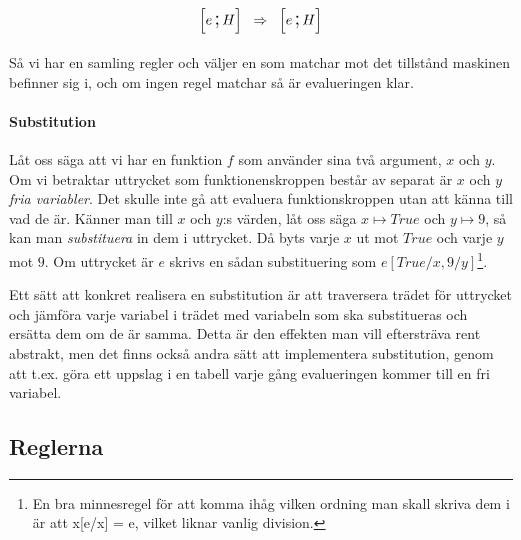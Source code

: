 \documentclass[../Core]{subfiles}
\begin{document}
\begin{equation*}
        \tikz[baseline]{\node[anchor=base] (m1) 
            {\conf{}{$ e \csep H$}};
        } \tikz[baseline]{\node[anchor=base](msep){$\rulesep$};}
        \tikz[baseline]{
            \node[anchor=base] (m2)
            {\conf{}{$ e \csep H$}};
        } 
\end{equation*}



Så vi har en samling regler och väljer en som matchar mot det tillstånd maskinen befinner sig i, och om ingen regel matchar så är evalueringen klar.

\paragraph{Substitution}

Låt oss säga att vi har en funktion $f$ som använder sina två 
argument, $x$ och $y$. Om vi betraktar uttrycket som funktionenskroppen består av separat är $x$ och $y$ 
\emph{fria variabler}. Det skulle inte gå att evaluera funktionskroppen utan
att känna till vad de är. Känner man till $x$ och $y$:s värden, låt oss säga
$x \mapsto True$ och $y \mapsto 9$, så kan man \emph{substituera} in dem i 
uttrycket. Då byts varje $x$ ut mot $True$ och varje $y$ mot $9$. Om uttrycket 
är $e$ skrivs en sådan substituering som $e[True/x, 9/y]$\footnote{
  En bra minnesregel för att komma ihåg vilken ordning man skall 
  skriva dem i är att x[e/x] = e, vilket liknar vanlig division.}. 

    Ett sätt att konkret realisera en substitution är att traversera trädet
för uttrycket och jämföra varje variabel i trädet med variabeln som ska 
substitueras och ersätta dem om de är samma. Detta är den effekten man vill 
eftersträva rent abstrakt, men det finns också andra sätt att implementera 
substitution, genom att t.ex. göra ett uppslag i en tabell varje gång 
evalueringen kommer till en fri variabel. 

\subsection{Reglerna}
\end{document}
